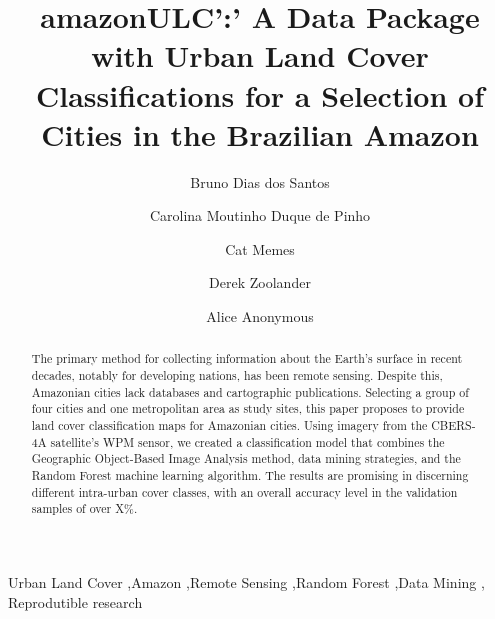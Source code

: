 \documentclass[preprint, 3p,
authoryear]{elsarticle} %
\begin{document}
\begin{frontmatter}

  \title{amazonULC':' A Data Package with Urban Land Cover
Classifications for a Selection of Cities in the Brazilian Amazon}
    \author[National Institute for Space Research (INPE)]{Bruno Dias dos
Santos%
  }
    \author[Federal University of ABC (UFABC)]{Carolina Moutinho Duque
de Pinho%
  }
    \author[Another University]{Cat Memes%
  }
    \author[Some Institute of Technology]{Derek Zoolander%
  }
    \author[Some Institute of Technology]{Alice Anonymous%
  }
  
  \begin{abstract}
  The primary method for collecting information about the Earth's
  surface in recent decades, notably for developing nations, has been
  remote sensing. Despite this, Amazonian cities lack databases and
  cartographic publications. Selecting a group of four cities and one
  metropolitan area as study sites, this paper proposes to provide land
  cover classification maps for Amazonian cities. Using imagery from the
  CBERS-4A satellite's WPM sensor, we created a classification model
  that combines the Geographic Object-Based Image Analysis method, data
  mining strategies, and the Random Forest machine learning algorithm.
  The results are promising in discerning different intra-urban cover
  classes, with an overall accuracy level in the validation samples of
  over X\%.
  \end{abstract}
    \begin{keyword}
    Urban Land Cover \sep Amazon \sep Remote Sensing \sep Random
Forest \sep Data Mining \sep 
    Reprodutible research
  \end{keyword}
  
 \end{frontmatter}
\end{document}
